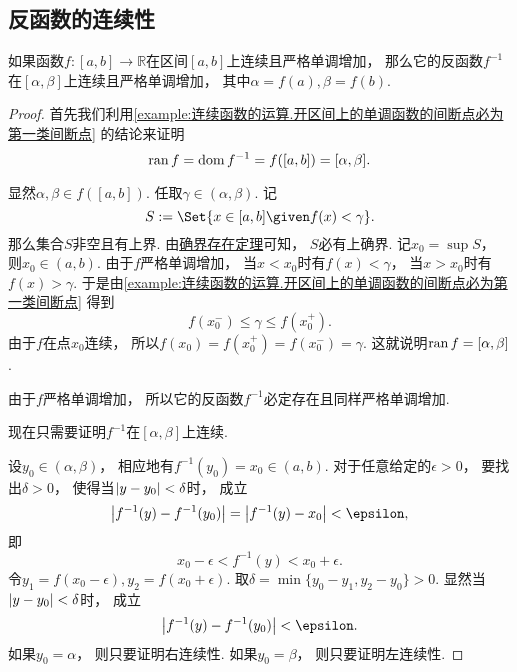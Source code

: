 \subsection{反函数的连续性}
\begin{theorem}\label{theorem:极限.连续函数的极限2}
如果函数\(f\colon[a,b]\to\mathbb{R}\)在区间\([a,b]\)上连续且严格单调增加，
那么它的反函数\(f^{-1}\)在\([\alpha,\beta]\)上连续且严格单调增加，
其中\(\alpha=f(a),\beta=f(b)\).
\begin{proof}
首先我们利用\cref{example:连续函数的运算.开区间上的单调函数的间断点必为第一类间断点} 的结论来证明\begin{equation*}
	\operatorname{ran} f
	= \operatorname{dom} f^{-1}
	= f([a,b])
	= [\alpha,\beta].
\end{equation*}

显然\(\alpha,\beta \in f([a,b])\).
任取\(\gamma\in(\alpha,\beta)\).
记\begin{equation*}
	S \defeq \Set{ x\in[a,b] \given f(x)<\gamma }.
\end{equation*}
那么集合\(S\)非空且有上界.
由\hyperref[theorem:实数.确界原理]{确界存在定理}可知，
\(S\)必有上确界.
记\(x_0 = \sup S\)，
则\(x_0\in(a,b)\).
由于\(f\)严格单调增加，
当\(x<x_0\)时有\(f(x)<\gamma\)，
当\(x>x_0\)时有\(f(x)>\gamma\).
于是由\cref{example:连续函数的运算.开区间上的单调函数的间断点必为第一类间断点} 得到\begin{equation*}
	f(x_0^-) \leq \gamma \leq f(x_0^+).
\end{equation*}
由于\(f\)在点\(x_0\)连续，
所以\(f(x_0)
= f(x_0^+)
= f(x_0^-)
= \gamma\).
这就说明\(\operatorname{ran} f = [\alpha,\beta]\).

由于\(f\)严格单调增加，
所以它的反函数\(f^{-1}\)必定存在且同样严格单调增加.

现在只需要证明\(f^{-1}\)在\([\alpha,\beta]\)上连续.

设\(y_0\in(\alpha,\beta)\)，
相应地有\(f^{-1}(y_0)=x_0\in(a,b)\).
对于任意给定的\(\epsilon>0\)，
要找出\(\delta>0\)，
使得当\(\abs{y-y_0}<\delta\)时，
成立\begin{equation*}
	\abs{f^{-1}(y) - f^{-1}(y_0)}
	= \abs{f^{-1}(y) - x_0}
	< \epsilon,
\end{equation*}
即\begin{equation*}
	x_0 - \epsilon < f^{-1}(y) < x_0 + \epsilon.
\end{equation*}
令\(y_1 = f(x_0 - \epsilon),
y_2 = f(x_0 + \epsilon)\).
取\(\delta = \min\{y_0 - y_1, y_2 - y_0\} > 0\).
显然当\(\abs{y - y_0} < \delta\)时，
成立\begin{equation*}
	\abs{f^{-1}(y) - f^{-1}(y_0)} < \epsilon.
\end{equation*}
如果\(y_0 = \alpha\)，
则只要证明右连续性.
如果\(y_0 = \beta\)，
则只要证明左连续性.
\end{proof}
\end{theorem}

